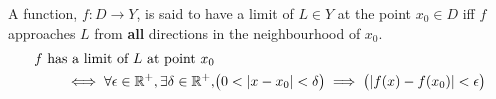 \begin{definition}
    A function, $f:D\rightarrow Y$, is said to have a limit of $L\in Y$ at the point $x_0\in D$ iff $f$ approaches $L$ from \textbf{all} directions in the neighbourhood of $x_0$.
    \begin{align}
        \text{$f$ has a limit of $L$ at point $x_0$}&\\
            \iff\forall\epsilon\in\R^+,\exists\delta\in\R^+,&\big(0<|x-x_0|<\delta\big)\implies\big(|f(x)-f(x_0)|<\epsilon\big)
    \end{align}
\end{definition}
